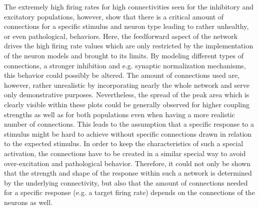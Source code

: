 \documentclass[14pt]{SelfArx} %
\numberwithin{equation}{section}
\begin{document}
\newline
The extremely high firing rates for high connectivities seen for the inhibitory and excitatory populations, however, show that there is a critical amount of connections for a specific stimulus and neuron type leading to rather unhealthy, or even pathological, behaviors. Here, the feedforward aspect of the network drives the high firing rate values which are only restricted by the implementation of the neuron models and brought to its limits. By modeling different types of connections, a stronger inhibition and e.g. synaptic normalization mechanisms, this behavior could possibly be altered. The amount of connections used are, however, rather unrealistic by incorporating nearly the whole network and serve only demonstrative purposes. \newline
Nevertheless, the spread of the peak area which is clearly visible within these plots could be generally observed for higher coupling strengths as well as for both populations even when having a more realistic number of connections. This leads to the assumption that a specific response to a stimulus might be hard to achieve without specific connections drawn in relation to the expected stimulus. In order to keep the characteristics of such a special activation, the connections have to be created in a similar special way to avoid over-excitation and pathological behavior.\newline
Therefore, it could not only be shown that the strength and shape of the response within such a network is determined by the underlying connectivity, but also that the amount of connections needed for a specific response (e.g. a target firing rate) depends on the connections of the neurons as well.
\end{document}
